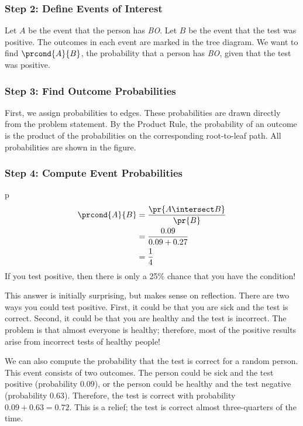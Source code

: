 \subsubsection*{Step 2: Define Events of Interest}

Let $A$ be the event that the person has \emph{BO}.  Let $B$ be the
event that the test was positive.  The outcomes in each event are marked
in the tree diagram.  We want to find $\prcond{A}{B}$, the probability
that a person has \emph{BO}, given that the test was positive.

\subsubsection*{Step 3: Find Outcome Probabilities}

First, we assign probabilities to edges.  These probabilities are drawn
directly from the problem statement.  By the Product Rule, the
probability of an outcome is the product of the probabilities on the
corresponding root-to-leaf path.  All probabilities are shown in the
figure.

\subsubsection*{Step 4: Compute Event Probabilities}
p
\begin{align*}
\prcond{A}{B}	& = \frac{\pr{A \intersect B}}{\pr{B}} \\
		& = \frac{0.09}{0.09 + 0.27} \\
		& = \frac{1}{4}
\end{align*}
%
If you test positive, then there is only a 25\% chance that you have
the condition!

This answer is initially surprising, but makes sense on reflection.
There are two ways you could test positive.  First, it could be that
you are sick and the test is correct.  Second, it could be that you
are healthy and the test is incorrect.  The problem is that almost
everyone is healthy; therefore, most of the positive results arise
from incorrect tests of healthy people!

We can also compute the probability that the test is correct for a
random person.  This event consists of two outcomes.  The person could
be sick and the test positive (probability $0.09$), or the person
could be healthy and the test negative (probability $0.63$).
Therefore, the test is correct with probability $0.09 + 0.63 = 0.72$.
This is a relief; the test is correct almost three-quarters of the
time.

